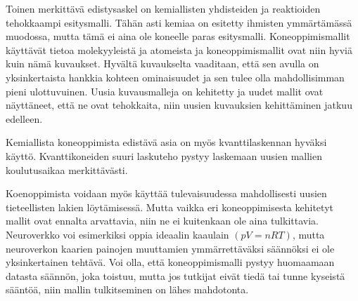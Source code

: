\documentclass[finnish,twoside,censored,tkt,sw-line]{HYthesisML}
\begin{document}
Toinen merkittävä edistysaskel on kemiallisten yhdisteiden ja reaktioiden tehokkaampi esitysmalli.
Tähän asti kemiaa on esitetty ihmisten ymmärtämässä muodossa, mutta tämä ei aina ole koneelle paras esitysmalli.
Koneoppimismallit käyttävät tietoa molekyyleistä ja atomeista ja koneoppimismallit ovat niin hyviä kuin nämä kuvaukset.
Hyvältä kuvaukselta vaaditaan, että sen avulla on yksinkertaista hankkia kohteen ominaisuudet ja sen tulee olla mahdollisimman pieni ulottuvuinen.
Uusia kuvausmalleja on kehitetty ja uudet mallit ovat näyttäneet, että ne ovat tehokkaita, niin uusien kuvauksien kehittäminen jatkuu edelleen.

Kemiallista koneoppimista edistävä asia on myös kvanttilaskennan hyväksi käyttö.
Kvanttikoneiden suuri laskuteho pystyy laskemaan uusien mallien koulutusaikaa merkittävästi.

Koenoppimista voidaan myös käyttää tulevaisuudessa mahdollisesti uusien tieteellisten lakien löytämisessä.
Mutta vaikka eri koneoppimisesta kehitetyt mallit ovat ennalta arvattavia, niin ne ei kuitenkaan ole aina tulkittavia.
Neuroverkko voi esimerkiksi oppia ideaalin kaaulain \((pV=nRT)\), mutta neuroverkon kaarien painojen muuttamien ymmärrettäväksi säännöksi ei ole yksinkertainen tehtävä.
Voi olla, että koneoppimismalli pystyy huomaamaan datasta säännön, joka toistuu, mutta jos tutkijat eivät tiedä tai tunne kyseistä sääntöä, niin mallin tulkitseminen on lähes mahdotonta.

\cleardoublepage{}                          %
\printbibliography{}

\backmatter{}



\end{document}
